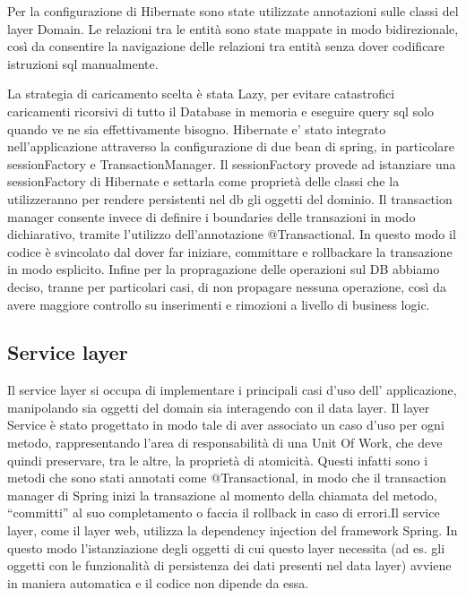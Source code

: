 Per la configurazione di Hibernate sono state utilizzate
annotazioni sulle classi del layer Domain.  Le relazioni tra le entità
sono state mappate in modo bidirezionale, così da consentire la
navigazione delle relazioni tra entità senza dover codificare
istruzioni sql manualmente. 

La strategia di caricamento scelta è stata Lazy, per evitare
catastrofici caricamenti ricorsivi di tutto il Database in memoria e
eseguire query sql solo quando ve ne sia effettivamente bisogno.
Hibernate e' stato integrato nell'applicazione attraverso la
configurazione di due bean di spring, in particolare sessionFactory e
TransactionManager. Il sessionFactory provede ad istanziare una
sessionFactory di Hibernate e settarla come proprietà delle classi che
la utilizzeranno per rendere persistenti nel db gli oggetti del
dominio. Il transaction manager consente invece di definire i
boundaries delle transazioni in modo dichiarativo, tramite l'utilizzo
dell'annotazione @Transactional.  In questo modo il codice è
svincolato dal dover far iniziare, committare e rollbackare la
transazione in modo esplicito. Infine per la propragazione delle operazioni sul DB abbiamo
deciso, tranne per particolari casi, di non propagare nessuna
operazione, così da avere maggiore controllo su inserimenti e
rimozioni a livello di business logic.




\subsection{Service layer}

Il service layer si occupa di implementare i principali casi d'uso
dell' applicazione, manipolando sia oggetti del domain sia interagendo
con il data layer.  Il layer Service è stato progettato in modo tale
di aver associato un caso d'uso per ogni metodo, rappresentando l'area
di responsabilità di una Unit Of Work, che deve quindi preservare, tra
le altre, la proprietà di atomicità. Questi infatti sono i metodi che
sono stati annotati come @Transactional, in modo che il transaction
manager di Spring inizi la transazione al momento della chiamata del
metodo, ``committi'' al suo completamento o faccia il rollback in caso
di errori.Il service layer, come il layer web, utilizza la
dependency injection del framework Spring. In questo modo
l'istanziazione degli oggetti di cui questo layer necessita (ad
es. gli oggetti con le funzionalità di persistenza dei dati presenti
nel data layer) avviene in maniera automatica e il codice non dipende
da essa.

